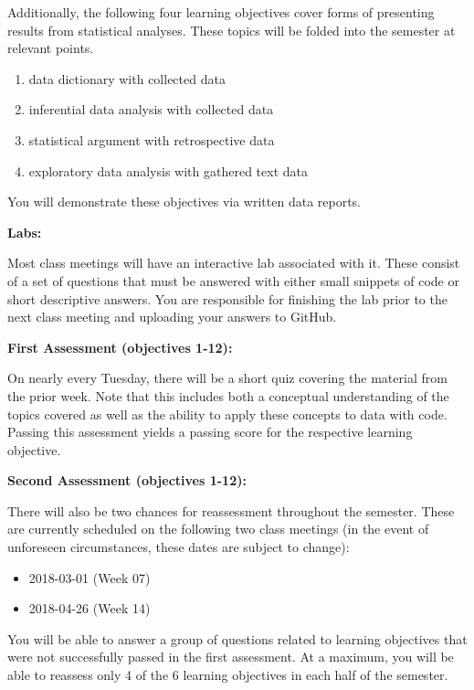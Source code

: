 \documentclass[12pt]{article}
\begin{document}
Additionally, the following four learning objectives cover
forms of presenting results from statistical analyses. These
topics will be folded into the semester at relevant points.

\begin{enumerate}\setlength\itemsep{0em} \setcounter{enumi}{12}
\item data dictionary with collected data
\item inferential data analysis with collected data
\item statistical argument with retrospective data
\item exploratory data analysis with gathered text data
\end{enumerate}
You will demonstrate these objectives via written data
reports.

\bigskip

\textbf{Labs:} \vspace{6pt}

Most class meetings will have an interactive lab associated with
it. These consist of a set of questions that must be answered with
either small snippets of code or short descriptive answers. You are
responsible for finishing the lab prior to the next class meeting
and uploading your answers to GitHub.

\bigskip

\textbf{First Assessment (objectives 1-12):} \vspace{6pt}

On nearly every Tuesday, there will be a short quiz covering
the material from the prior week. Note that this includes both
a conceptual understanding of the topics covered as well as the
ability to apply these concepts to data with code. Passing this
assessment yields a passing score for the respective learning
objective.

\newpage

\textbf{Second Assessment (objectives 1-12):} \vspace{6pt}

There will also be two chances for reassessment throughout the
semester. These are currently scheduled on the following two
class meetings (in the event of unforeseen circumstances, these
dates are subject to change):
\begin{itemize}\setlength\itemsep{0em}
\item 2018-03-01 (Week 07)
\item 2018-04-26 (Week 14)
\end{itemize}
You will be able to answer a group of questions related to
learning objectives that were not successfully passed in the
first assessment. At a maximum, you will be able to reassess
only 4 of the 6 learning objectives in each half of the semester.
\end{document}
